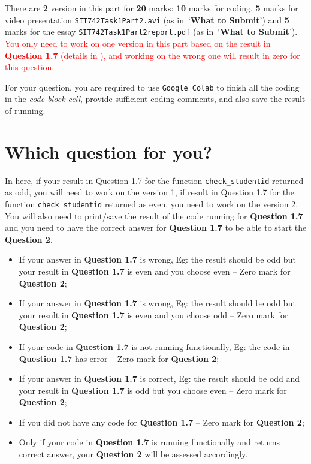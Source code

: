 \documentclass[a4paper]{article}
\begin{document}
    There are \textbf{2} version in this part for \textbf{20} marks:
    \textbf{10} marks for coding, \textbf{5} marks for video presentation \texttt{SIT742Task1Part2.avi} 
    (as in~`\textbf{What to Submit}')
    and \textbf{5} marks for the essay \texttt{SIT742Task1Part2report.pdf} (as in~`\textbf{What to Submit}'). 
    \textcolor{red}{You only need to work on one version in this part
    based on the result in \textbf{Question 1.7} (details in ), and working on the wrong one will result in zero for this question}.  
    
    For your question,
    you are required to use \texttt{Google Colab} 
    to finish all the coding in the \textit{code block cell}, 
    provide sufficient coding comments, 
    and also save the result of running.   
    
    \section{Which question for you?}\label{sec-which}

    In here, 
    if your result in Question 1.7 for the function \texttt{check_studentid} returned as odd, you will need to work on the version 1, if result in Question 1.7 for the function \texttt{check_studentid} returned as even, you need to work on the version 2.
    You will also need to print/save the result of the code running for \textbf{Question 1.7} and you need to have the correct answer for \textbf{Question 1.7} to be able to start the \textbf{Question 2}.

    \begin{itemize}
        \item If your answer in \textbf{Question 1.7} is wrong, Eg: the result should be odd but your result in \textbf{Question 1.7} is even and you choose even -- Zero mark for \textbf{Question 2};
        \item If your answer in \textbf{Question 1.7} is wrong, Eg: the result should be odd but your result in \textbf{Question 1.7} is even and you choose odd -- Zero mark for \textbf{Question 2};
        \item If your code in \textbf{Question 1.7} is not running functionally, Eg: the code in \textbf{Question 1.7} has error -- Zero mark for \textbf{Question 2};
        \item If your answer in \textbf{Question 1.7} is correct, Eg: the result should be odd and your result in \textbf{Question 1.7} is odd but you choose even -- Zero mark for \textbf{Question 2};
        \item If you did not have any code for \textbf{Question 1.7} -- Zero mark for \textbf{Question 2};
        \item Only if your code in \textbf{Question 1.7} is running functionally and returns correct answer, your \textbf{Question 2} will be assessed accordingly.
    \end{itemize}
    
\end{document}

